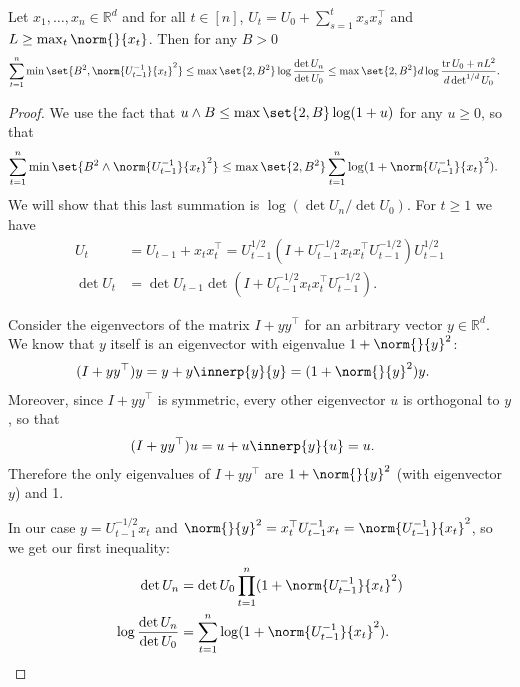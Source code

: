\documentclass{article}
\newcommand{\inv}[1]{#1^{-1}}
\newcommand{\Real}{\mathds{R}}
\DeclareMathOperator{\tr}{tr}
\newcommand{\transp}[1]{#1^\top}
\begin{document}
\begin{lemma}\label{lemma:elliptical-potential}
  Let $x_1,\dotsc,x_n \in \Real^d$ and for all $t\in[n]$,
  $U_t = U_0 + \sum_{s=1}^t x_s \transp{x_s}$ and
  $L \ge \max_t\norm{}{x_t}$. Then for any $B > 0$
  \begin{align*}
    \sum_{t=1}^n\min\set{B^2, \norm{\inv{U_{t-1}}}{x_t}^2}
    &\le \max\set{2, B^2}\log\frac{\det U_n}{\det U_0}
      \le \max\set{2, B^2} d\log\frac{\tr U_0+nL^2}{d\det^{1/d} U_0}.
  \end{align*}

  \begin{proof}
    We use the fact that $u \wedge B \le \max\set{2, B}\log(1+u)$ for
    any $u \ge 0$, so that
    \begin{align*}
      \sum_{t=1}^n\min\set{B^2 \wedge \norm{\inv{U_{t-1}}}{x_t}^2}
      &\le \max\set{2, B^2} \sum_{t=1}^n \log(1 + \norm{\inv{U_{t-1}}}{x_t}^2).
    \end{align*}
    We will show that this last summation is $\log(\det U_n/\det
    U_0)$.  For $t \ge 1$ we have
    \begin{align*}
      U_t &= U_{t-1} + x_t\transp{x_t}
           = U_{t-1}^{1/2} (I + U_{t-1}^{-1/2}x_t\transp{x_t}U_{t-1}^{-1/2}) U_{t-1}^{1/2} \\
      \det U_t &= \det U_{t-1}\det(I + U_{t-1}^{-1/2}x_t\transp{x_t}U_{t-1}^{-1/2}).
    \end{align*}

    Consider the eigenvectors of the matrix $I+y\transp{y}$ for an
    arbitrary vector $y\in\Real^d$.  We know that $y$ itself is an
    eigenvector with eigenvalue $1+\norm{}{y}^2$:
    \begin{align*}
      (I + y\transp{y})y &= y + y\innerp{y}{y} = (1+\norm{}{y}^2)y.
    \end{align*}
    Moreover, since $I+y\transp{y}$ is symmetric, every other
    eigenvector $u$ is orthogonal to $y$, so that
    \begin{align*}
      (I + y\transp{y})u &= u + u\innerp{y}{u} = u.
    \end{align*}
    Therefore the only eigenvalues of $I+y\transp{y}$ are
    $1+\norm{}{y}^2$ (with eigenvector $y$) and 1.

    In our case $y = U_{t-1}^{-1/2}x_t$ and $\norm{}{y}^2 =
    \transp{x_t}\inv{U_{t-1}}x_t = \norm{\inv{U_{t-1}}}{x_t}^2$, so we get our
    first inequality:
    \begin{align*}
      \det U_n &= \det U_0 \prod_{t=1}^n(1 + \norm{\inv{U_{t-1}}}{x_t}^2) \\
      \log\frac{\det U_n}{\det U_0} &= \sum_{t=1}^n\log(1+\norm{\inv{U_{t-1}}}{x_t}^2).
    \end{align*}


\end{proof}
\end{lemma}
\end{document}
